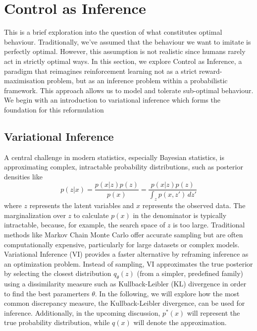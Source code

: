 \section{Control as Inference}
This is a brief exploration into the question of what constitutes optimal behaviour. Traditionally, we’ve 
assumed that the behaviour we want to imitate is perfectly optimal. However, this assumption is not realistic
since humans rarely act in strictly optimal ways.\newline
In this section, we explore Control as Inference, a paradigm that reimagines reinforcement learning not as a strict 
reward-maximisation problem, but as an inference problem within a probabilistic framework. This approach allows us to 
model and tolerate sub-optimal behaviour. We begin with an introduction to variational inference which forms the 
foundation for this reformulation

\subsection{Variational Inference}
A central challenge in modern statistics, especially Bayesian statistics, is approximating complex, intractable 
probability distributions, such as posterior densities like 
$$p(z|x) = \frac{p(x|z)p(z)}{p(x)} = \frac{p(x|z)p(z)}{\int_z p(x,z')\, dz'}$$
where $z$ represents the latent variables and $x$ represents the observed data. The marginalization over $z$ to 
calculate $p(x)$ in the denominator is typically intractable, because, for example, the search space of $z$ is too 
large. Traditional methods like Markov Chain Monte Carlo offer accurate sampling but are often computationally 
expensive, particularly for large datasets or complex models. \newline
Variational Inference (VI) provides a faster alternative by reframing inference as an optimization problem. Instead 
of sampling, VI approximates the true posterior by selecting the closest distribution $q_\theta(z)$ (from a simpler, 
predefined family) using a dissimilarity measure such as Kullback-Leibler (KL) divergence in order to find 
the best paramerters $\theta$.\newline 
In the following, we will explore how the most common discrepancy measure, the Kullback-Leibler divergence, can be 
used for inference. Additionally, in the upcoming discussion, $p^*(x)$ will represent the true probability 
distribution, while  $q(x)$ will denote the approximation.


